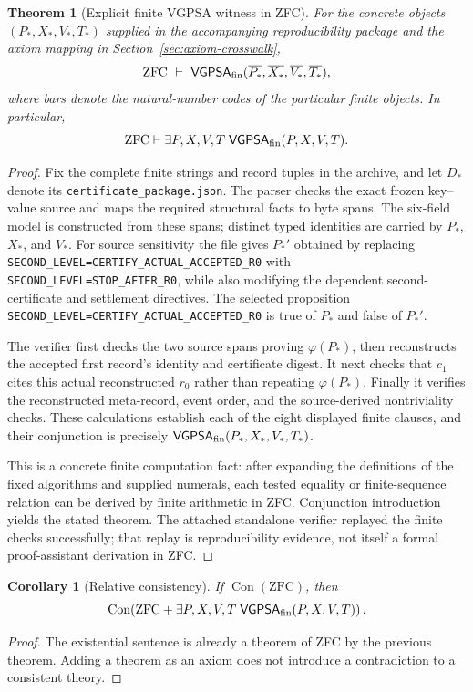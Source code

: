 \documentclass[11pt]{article}
\newtheorem{theorem}[definition]{Theorem}
\newtheorem{corollary}[definition]{Corollary}
\theoremstyle{remark}
\begin{document}
\begin{theorem}[Explicit finite VGPSA witness in ZFC]
For the concrete objects $(P_*,X_*,V_*,T_*)$ supplied in the accompanying reproducibility package and the axiom mapping in Section~\ref{sec:axiom-crosswalk},
\[
\mathrm{ZFC}\ \vdash\ \mathsf{VGPSA}_{\rm fin}(\overline{P_*},\overline{X_*},\overline{V_*},\overline{T_*}),
\]
where bars denote the natural-number codes of the particular finite objects. In particular,
\[
\mathrm{ZFC}\vdash\exists P,X,V,T\;\mathsf{VGPSA}_{\rm fin}(P,X,V,T).
\]
\end{theorem}
\begin{proof}
Fix the complete finite strings and record tuples in the archive, and let $D_*$ denote its \texttt{certificate\_package.json}. The parser checks the exact frozen key--value source and maps the required structural facts to byte spans. The six-field model is constructed from these spans; distinct typed identities are carried by $P_*$, $X_*$, and $V_*$. For source sensitivity the file gives $P_*'$ obtained by replacing \texttt{SECOND\_LEVEL=CERTIFY\_ACTUAL\_ACCEPTED\_R0} with \texttt{SECOND\_LEVEL=STOP\_AFTER\_R0}, while also modifying the dependent second-certificate and settlement directives. The selected proposition \texttt{SECOND\_LEVEL=CERTIFY\_ACTUAL\_ACCEPTED\_R0} is true of $P_*$ and false of $P_*'$.

The verifier first checks the two source spans proving $\varphi(P_*)$, then reconstructs the accepted first record's identity and certificate digest. It next checks that $c_1$ cites this actual reconstructed $r_0$ rather than repeating $\varphi(P_*)$. Finally it verifies the reconstructed meta-record, event order, and the source-derived nontriviality checks. These calculations establish each of the eight displayed finite clauses, and their conjunction is precisely $\mathsf{VGPSA}_{\rm fin}(P_*,X_*,V_*,T_*)$.

This is a concrete finite computation fact: after expanding the definitions of the fixed algorithms and supplied numerals, each tested equality or finite-sequence relation can be derived by finite arithmetic in ZFC. Conjunction introduction yields the stated theorem. The attached standalone verifier replayed the finite checks successfully; that replay is reproducibility evidence, not itself a formal proof-assistant derivation in ZFC.\end{proof}

\begin{corollary}[Relative consistency]
If $\operatorname{Con}(\mathrm{ZFC})$, then
\[
\operatorname{Con}\!\left(\mathrm{ZFC}+\exists P,X,V,T\;\mathsf{VGPSA}_{\rm fin}(P,X,V,T)\right).
\]
\end{corollary}
\begin{proof}
The existential sentence is already a theorem of ZFC by the previous theorem. Adding a theorem as an axiom does not introduce a contradiction to a consistent theory.\end{proof}
\end{document}
